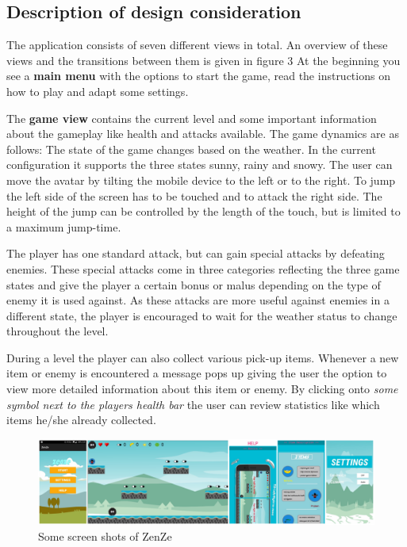 \documentclass{sigchi}
\begin{document}
\subsection{Description of design consideration}

The application consists of seven different views in total. An overview of these views and the transitions between them is given in figure 3 %
At the beginning you see a \textbf{main menu} with the options to start the game, read the instructions on how to play and adapt some settings.

The \textbf{game view} contains the current level and some important information about the gameplay like health and attacks available. The game dynamics are as follows: The state of the game changes based on the weather. In the current configuration it supports the three states sunny, rainy and snowy. The user can move the avatar by tilting the mobile device to the left or to the right. To jump the left side of the screen has to be touched and to attack the right side. The height of the jump can be controlled by the length of the touch, but is limited to a maximum jump-time.

The player has one standard attack, but can gain special attacks by defeating enemies. These special attacks come in three categories reflecting the three game states and give the player a certain bonus or malus depending on the type of enemy it is used against. As these attacks are more useful against enemies in a different state, the player is encouraged to wait for the weather status to change throughout the level.

During a level the player can also collect various pick-up items. Whenever a new item or enemy is encountered a message pops up giving the user the option to view more detailed information about this item or enemy. By clicking onto \textit{some symbol next to the players health bar} the user can review statistics like which items he/she already collected.





\begin{figure}
\centering
\includegraphics[width=7in]{figures/zenzescreenshot.jpg}
\caption{Some screen shots of ZenZe}
\label{fig3}
\end{figure}
\end{document}
